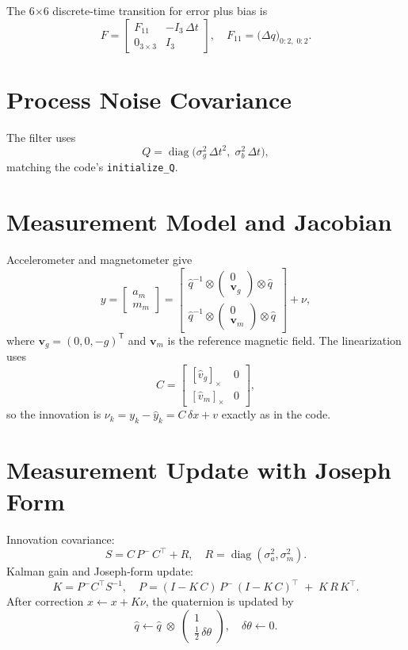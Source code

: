 \documentclass[11pt,letterpaper]{article}
\begin{document}
The 6×6 discrete‐time transition for error plus bias is
\[
F =
\begin{bmatrix}
F_{11} & -I_3\,\Delta t\\[3pt]
0_{3\times3} & I_3
\end{bmatrix},
\quad
F_{11} = \bigl(\Delta q\bigr)_{0\!:\!2,\;0\!:\!2}.
\]

\section{Process Noise Covariance}
The filter uses
\[
Q = \operatorname{diag}\bigl(\sigma_g^2\,\Delta t^2,\;\sigma_b^2\,\Delta t\bigr),
\]
matching the code’s \texttt{initialize\_Q}.

\section{Measurement Model and Jacobian}
Accelerometer and magnetometer give
\[
y = \begin{bmatrix}a_m\\ m_m\end{bmatrix}
=
\begin{bmatrix}
\hat q^{-1}\otimes
\begin{pmatrix}0 \\ \mathbf v_g\end{pmatrix}
\otimes\hat q
\\[8pt]
\hat q^{-1}\otimes
\begin{pmatrix}0 \\ \mathbf v_m\end{pmatrix}
\otimes\hat q
\end{bmatrix}
+ \nu,
\]
where $\mathbf v_g=(0,0,-g)^\mathsf{T}$ and $\mathbf v_m$ is the reference magnetic field.  The linearization uses
\[
C =
\begin{bmatrix}
[\hat v_g]_\times & 0\\[3pt]
[\hat v_m]_\times & 0
\end{bmatrix},
\]
so the innovation is $\nu_k=y_k-\hat y_k=C\,\delta x+v$ exactly as in the code.

\section{Measurement Update with Joseph Form}
Innovation covariance:
\[
S = C\,P^-\,C^\top + R,
\quad R=\operatorname{diag}(\sigma_a^2,\sigma_m^2).
\]
Kalman gain and Joseph‐form update:
\[
K = P^-C^\top S^{-1},\quad
P = (I - K\,C)\,P^-\,(I - K\,C)^\top \;+\; K\,R\,K^\top.
\]
After correction $x\leftarrow x + K\nu$, the quaternion is updated by
\[
\hat q \leftarrow \hat q \;\otimes\;
\begin{pmatrix}1\\ \tfrac12\,\delta\theta\end{pmatrix},
\quad
\delta\theta\leftarrow0.
\]
\end{document}

